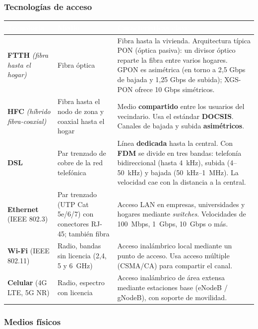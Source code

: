 \documentclass[11pt,a4paper]{article}
\newcommand{\hd}[1]{\cellcolor{uahblue}\textcolor{white}{\textbf{#1}}}
\newcommand{\en}[1]{\emph{(#1)}}
\begin{document}
\subsubsection{Tecnologías de acceso}

\begin{tabularx}{\textwidth}{@{}L{2.6cm}L{3.3cm}X@{}}
\toprule
\hd{Tecnología} & \hd{Medio} & \hd{Características clave} \\
\midrule
\textbf{FTTH} \en{fibra hasta el hogar} & Fibra óptica & Fibra hasta la vivienda. Arquitectura típica PON (óptica pasiva): un divisor óptico reparte la fibra entre varios hogares. GPON es asimétrica (en torno a 2{,}5 Gbps de bajada y 1{,}25 Gbps de subida); XGS-PON ofrece 10 Gbps simétricos. \\
\textbf{HFC} \en{híbrido fibra-coaxial} & Fibra hasta el nodo de zona y coaxial hasta el hogar & Medio \textbf{compartido} entre los usuarios del vecindario. Usa el estándar \textbf{DOCSIS}. Canales de bajada y subida \textbf{asimétricos}. \\
\textbf{DSL} & Par trenzado de cobre de la red telefónica & Línea \textbf{dedicada} hasta la central. Con \textbf{FDM} se divide en tres bandas: telefonía bidireccional (hasta 4~kHz), subida (4--50~kHz) y bajada (50~kHz--1~MHz). La velocidad cae con la distancia a la central. \\
\textbf{Ethernet} (IEEE 802.3) & Par trenzado (UTP Cat\,5e/6/7) con conectores RJ-45; también fibra & Acceso LAN en empresas, universidades y hogares mediante \emph{switches}. Velocidades de 100~Mbps, 1~Gbps, 10~Gbps o más. \\
\textbf{Wi-Fi} (IEEE 802.11) & Radio, bandas sin licencia (2{,}4, 5 y 6~GHz) & Acceso inalámbrico local mediante un punto de acceso. Usa acceso múltiple (CSMA/CA) para compartir el canal. \\
\textbf{Celular} (4G LTE, 5G NR) & Radio, espectro con licencia & Acceso inalámbrico de área extensa mediante estaciones base (eNodeB / gNodeB), con soporte de movilidad. \\
\bottomrule
\end{tabularx}

\subsubsection{Medios físicos}
\end{document}
